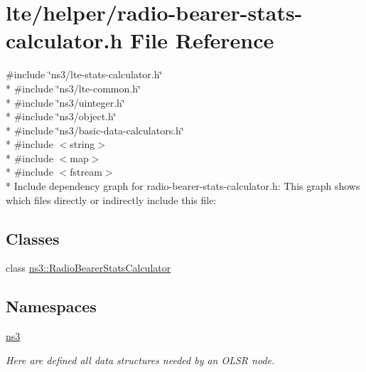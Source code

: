 \hypertarget{radio-bearer-stats-calculator_8h}{}\section{lte/helper/radio-\/bearer-\/stats-\/calculator.h File Reference}
\label{radio-bearer-stats-calculator_8h}
{\ttfamily \#include \char`\"{}ns3/lte-\/stats-\/calculator.\+h\char`\"{}}\\*
{\ttfamily \#include \char`\"{}ns3/lte-\/common.\+h\char`\"{}}\\*
{\ttfamily \#include \char`\"{}ns3/uinteger.\+h\char`\"{}}\\*
{\ttfamily \#include \char`\"{}ns3/object.\+h\char`\"{}}\\*
{\ttfamily \#include \char`\"{}ns3/basic-\/data-\/calculators.\+h\char`\"{}}\\*
{\ttfamily \#include $<$string$>$}\\*
{\ttfamily \#include $<$map$>$}\\*
{\ttfamily \#include $<$fstream$>$}\\*
Include dependency graph for radio-\/bearer-\/stats-\/calculator.h\+:
This graph shows which files directly or indirectly include this file\+:
\subsection*{Classes}
\begin{DoxyCompactItemize}
\item 
class \hyperlink{classns3_1_1RadioBearerStatsCalculator}{ns3\+::\+Radio\+Bearer\+Stats\+Calculator}
\end{DoxyCompactItemize}
\subsection*{Namespaces}
\begin{DoxyCompactItemize}
\item 
 \hyperlink{namespacens3}{ns3}
\begin{DoxyCompactList}\small\item\em Here are defined all data structures needed by an O\+L\+SR node. \end{DoxyCompactList}\end{DoxyCompactItemize}
